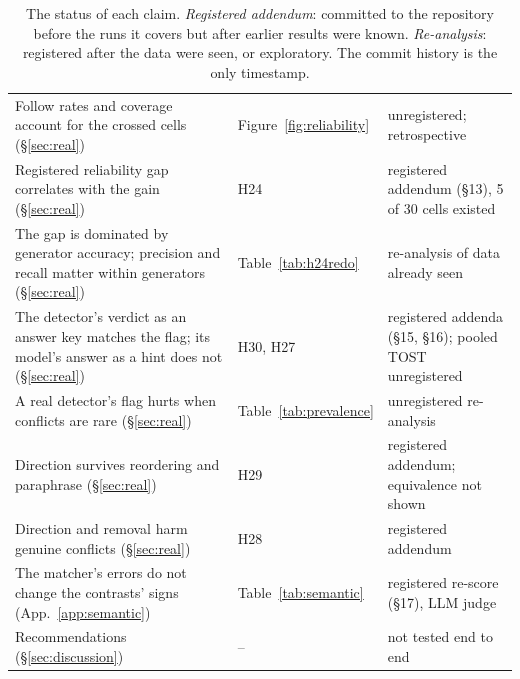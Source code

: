 \begin{table}[t]
\begin{tabular}{p{7.4cm}p{3.6cm}p{4.2cm}}
Follow rates and coverage account for the crossed cells (\S\ref{sec:real}) & Figure~\ref{fig:reliability} & unregistered; retrospective \\
Registered reliability gap correlates with the gain (\S\ref{sec:real}) & H24 & registered addendum (\S13), 5 of 30 cells existed \\
The gap is dominated by generator accuracy; precision and recall matter within generators (\S\ref{sec:real}) & Table~\ref{tab:h24redo} & re-analysis of data already seen \\
The detector's verdict as an answer key matches the flag; its model's answer as a hint does not (\S\ref{sec:real}) & H30, H27 & registered addenda (\S15, \S16); pooled TOST unregistered \\
A real detector's flag hurts when conflicts are rare (\S\ref{sec:real}) & Table~\ref{tab:prevalence} & unregistered re-analysis \\
Direction survives reordering and paraphrase (\S\ref{sec:real}) & H29 & registered addendum; equivalence not shown \\
Direction and removal harm genuine conflicts (\S\ref{sec:real}) & H28 & registered addendum \\
The matcher's errors do not change the contrasts' signs (App.~\ref{app:semantic}) & Table~\ref{tab:semantic} & registered re-score (\S17), LLM judge \\
Recommendations (\S\ref{sec:discussion}) & -- & not tested end to end \\
\bottomrule
\end{tabular}
\caption{The status of each claim. \emph{Registered addendum}: committed to the repository before the runs it covers but
after earlier results were known. \emph{Re-analysis}: registered after the data were seen, or exploratory. The commit
history is the only timestamp.}
\label{tab:claims}
\end{table}

